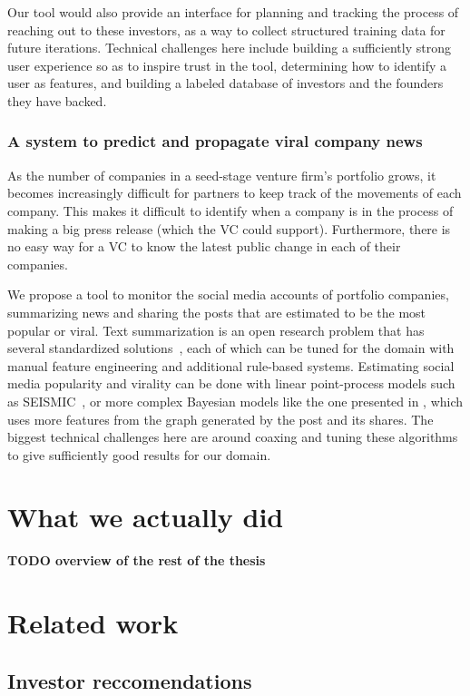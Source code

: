 Our tool would also provide an interface for planning and tracking the process of reaching out to these investors, as a way to collect structured training data for future iterations. Technical challenges here include building a sufficiently strong user experience so as to inspire trust in the tool, determining how to identify a user as features, and building a labeled database of investors and the founders they have backed.

\subsubsection{A system to predict and propagate viral company news}

As the number of companies in a seed-stage venture firm's portfolio grows, it becomes increasingly difficult for partners to keep track of the movements of each company. This makes it difficult to identify when a company is in the process of making a big press release (which the VC could support). Furthermore, there is no easy way for a VC to know the latest public change in each of their companies.

We propose a tool to monitor the social media accounts of portfolio companies, summarizing news and sharing the posts that are estimated to be the most popular or viral. Text summarization is an open research problem that has several standardized solutions~\cite{textsummarization}, each of which can be tuned for the domain with manual feature engineering and additional rule-based systems. Estimating social media popularity and virality can be done with linear point-process models such as SEISMIC~\cite{seismic}, or more complex Bayesian models like the one presented in \cite{bayesiantweets}, which uses more features from the graph generated by the post and its shares. The biggest technical challenges here are around coaxing and tuning these algorithms to give sufficiently good results for our domain.

\section{What we actually did}

\textbf{TODO overview of the rest of the thesis}

\section{Related work}

\subsection{Investor reccomendations}

